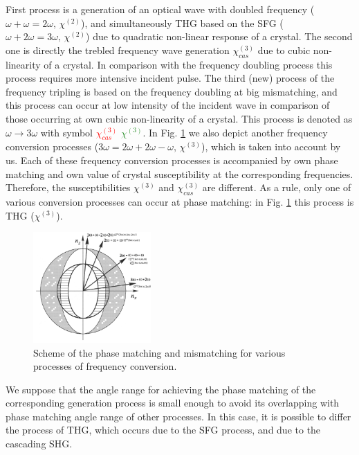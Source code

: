 \documentclass[a4paper, 12pt, onecolumn]{extarticle}
\begin{document}
First process is a generation of an optical wave with doubled frequency (\(\omega+\omega=2\omega,\,\chi^{(2)}\)), and simultaneously THG based on the SFG (\(\omega+2\omega=3\omega,\,\chi^{(2)}\)) due to quadratic non-linear response of a crystal. The second one is directly the trebled frequency wave generation \(\chi^{(3)}_{cas}\)   due to cubic non-linearity of a crystal. In comparison with the frequency doubling process this process requires  more intensive  incident pulse. The third (new) process of the frequency tripling is based on the frequency doubling at big mismatching, and this process can occur at low intensity of the incident wave in comparison of those occurring at own cubic non-linearity of a crystal. This process is denoted as \(\omega\rightarrow3\omega\) with symbol \textcolor{red}{ \(\chi^{(3)}_{cas}\)} \textcolor{ForestGreen}{$\chi^{(3)}$}. In Fig. \ref{fr:match} we also depict another frequency conversion processes (\(3\omega=2\omega+2\omega-\omega,\,\chi^{(3)}\)), which is taken into account by us. Each of these frequency conversion processes is accompanied by own phase matching and own value of crystal susceptibility at the corresponding frequencies. Therefore, the susceptibilities \(\chi^{(3)}\) and  \(\chi^{(3)}_{cas}\) are different. As a rule, only one of various conversion processes can occur at phase matching: in Fig. \ref{fr:match} this process is THG ($\chi^{(3)}$).
\begin{figure}[h!]
\centering
\includegraphics[width=0.4\textwidth]{Matching2}
\caption{Scheme of the phase matching and mismatching for various processes of frequency conversion.}
\label{fr:match}
\end{figure}
We suppose that the angle range for achieving the phase matching of the corresponding generation process is small enough to avoid its overlapping with phase matching angle range of other processes. In this case, it is possible to differ the process of THG, which occurs due to the SFG process, and due to the cascading SHG.
\end{document}
